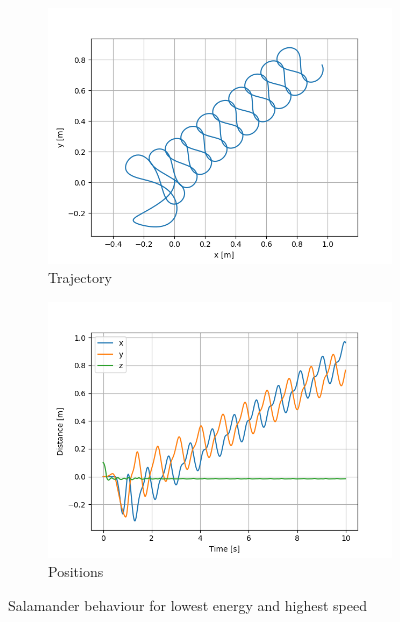 \documentclass{cmc}
\begin{document}
\begin{figure}[H] 
  \begin{subfigure}[b]{0.5\linewidth}
    \centering
    \includegraphics[width=0.9\linewidth]{figures/Trajectory.png} 
    \caption{Trajectory} 
    \label{fig:exercise8b_behaviour:a} 
  \end{subfigure}%
  \begin{subfigure}[b]{0.5\linewidth}
    \centering
    \includegraphics[width=0.9\linewidth]{figures/Positions.png} 
    \caption{Positions} 
    \label{fig:exercise8a_behaviour:b} 
  \end{subfigure}
  \caption{Salamander behaviour for lowest energy and highest speed}
  \label{fig:exercise8b_behaviour} 
\end{figure}
\end{document}
